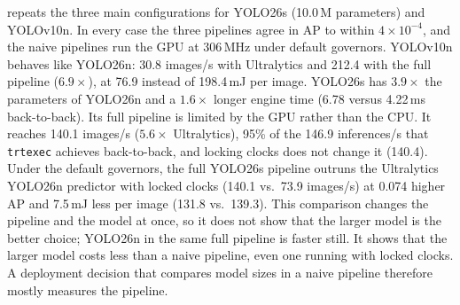 

 repeats the three main configurations for
YOLO26s (10.0\,M parameters) and YOLOv10n. In every case the three
pipelines agree in AP to within $4\times10^{-4}$, and the naive
pipelines run the GPU at 306\,MHz under default governors. YOLOv10n
behaves like YOLO26n: 30.8 images/s with Ultralytics and 212.4 with the
full pipeline ($6.9\times$), at 76.9 instead of 198.4\,mJ per image.
YOLO26s has $3.9\times$ the parameters of YOLO26n and a $1.6\times$
longer engine time (6.78 versus 4.22\,ms back-to-back). Its full
pipeline is limited by the GPU rather than the CPU. It reaches
140.1 images/s ($5.6\times$ Ultralytics), 95\% of the 146.9
inferences/s that \texttt{trtexec} achieves back-to-back, and locking
clocks does not change it (140.4). Under the default governors, the full
YOLO26s pipeline outruns the Ultralytics YOLO26n predictor with locked
clocks (140.1 vs.\ 73.9 images/s) at 0.074 higher AP and 7.5\,mJ less
per image (131.8 vs.\ 139.3). This comparison changes the pipeline and
the model at once, so it does not show that the larger model is the
better choice; YOLO26n in the same full pipeline is faster still. It
shows that the larger model costs less than a naive pipeline, even one
running with locked clocks. A deployment decision that compares model
sizes in a naive pipeline therefore mostly measures the pipeline.
